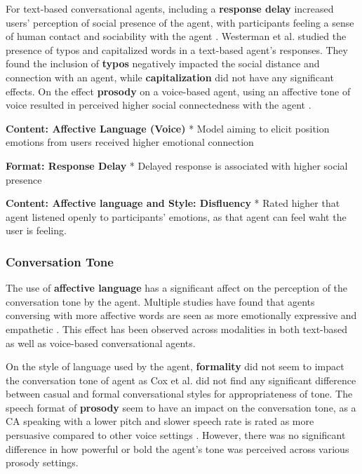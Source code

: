 \documentclass[sigconf,screen,review, anonymous]{acmart}
\newcommand{\cmt}[1]{}%
\begin{document}
For text-based conversational agents, including a \textbf{response delay} increased users' perception of social presence of the agent, with participants feeling a sense of human contact and sociability with the agent \cite{kim2020can}\cmt{[24]}. Westerman et al. \cite{westerman2019believe}\cmt{[9]} studied the presence of typos and capitalized words in a text-based agent's responses. They found the inclusion of \textbf{typos} negatively impacted the social distance and connection with an agent, while \textbf{capitalization} did not have any significant effects. On the effect \textbf{prosody} on a voice-based agent, using an affective tone of voice resulted in perceived higher social connectedness with the agent \cite{kim2020can}\cmt{[24]}.

\textbf{Content: Affective Language (Voice)}
* Model aiming to elicit position emotions from users received higher emotional connection \cite{lubis2019positive}\cmt{[43]}

\textbf{Format: Response Delay}
* Delayed response is associated with higher social presence \cite{gnewuch2022opposing}\cmt{[20]}

\textbf{Content: Affective language and Style: Disfluency}
* Rated higher that agent listened openly to participants' emotions, as that agent can feel waht the user is feeling. \cite{hu2021enhancing}\cmt{[56]}

\subsubsection{Conversation Tone}

The use of \textbf{affective language} has a significant affect on the perception of the conversation tone by the agent. Multiple studies have found that agents conversing with more affective words are seen as more emotionally expressive and empathetic \cite{daher2020empathic}\cmt{[58]}\cite{diederich2019emulating}\cmt{[25]}\cite{yang2017perceived}\cmt{[44]}\cite{zhu2022effects}\cmt{[26]}. This effect has been observed across modalities in both text-based as well as voice-based conversational agents.

On the style of language used by the agent, \textbf{formality} did not seem to impact the conversation tone of agent as Cox et al. \cite{cox2022does}\cmt{[27]} did not find any significant difference between casual and formal conversational styles for appropriateness of tone. The speech format of \textbf{prosody} seem to have an impact on the conversation tone, as a CA speaking with a lower pitch and slower speech rate is rated as more persuasive compared to other voice settings \cite{dubiel2020persuasive}\cmt{[60]}. However, there was no significant difference in how powerful or bold the agent's tone was perceived across various prosody settings.
\end{document}
